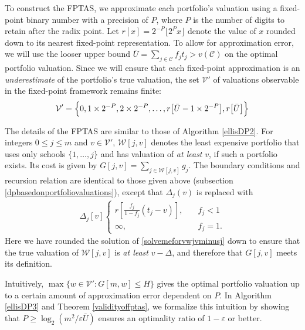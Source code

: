 \documentclass[11pt]{article} %
\theoremstyle{definition}
\begin{document}
To construct the FPTAS, we approximate each portfolio's valuation using a fixed-point binary number with a precision of $P$, where $P$ is the number of digits to retain after the radix point. Let $r[x] =  2^{-P}\lfloor 2^P x \rfloor$ denote the value of $x$ rounded down to its nearest fixed-point representation. To allow for approximation error, we will use the looser upper bound $\bar U = \sum_{j\in \mathcal{C}} f_j t_j > v(\mathcal{C})$ on the optimal portfolio valuation. Since we will ensure that each fixed-point approximation is an \emph{underestimate} of the portfolio's true valuation, the set $\mathcal{V}'$ of valuations observable in the fixed-point framework remains finite:
\begin{equation}
\mathcal{V}' = \Bigl\{0, 1\times 2^{-P}, 2\times 2^{-P}, \dots, r\bigl[\bar U- 1\times 2^{-P}\bigr], r\bigl[\bar U\bigr]\Bigr\}
\end{equation}


The details of the FPTAS are similar to those of Algorithm \ref{ellisDP2}. For integers $0 \leq j \leq m$ and $v \in \mathcal{V}'$, $\mathcal{W}[j, v]$ denotes the least expensive portfolio that uses only schools $\{ 1, \dots, j\}$ and has valuation of \emph{at least} $v$, if such a portfolio exists. Its cost is given by $G[j, v] = \sum_{j\in \mathcal{W}[j, v]} g_j$. The boundary conditions and recursion relation are identical to those given above (subsection \ref{dpbasedonportfoliovaluations}), except that $\Delta_j(v)$ is replaced with
\begin{align}
\Delta_j[v]
\begin{cases}
r\left[\frac{f_j}{1 - f_j} (t_j - v)\right], \quad & f_j < 1\\
\infty, &f_j = 1.
\end{cases} \label{clampeddeltajvdef}
\end{align}
Here we have rounded the solution of \eqref{solvemeforvwjvminusj} down to ensure that the true valuation of $\mathcal{W}[j, v]$ is \emph{at least} $v - \Delta$, and therefore that $G[j, v]$ meets its definition.

Intuitively, $\max\{ w \in \mathcal{V}': G[m, w] \leq H\}$ gives the optimal portfolio valuation up to a certain amount of approximation error dependent on $P$. In Algorithm \ref{ellisDP3} and Theorem \ref{validityoffptas}, we formalize this intuition by showing that $P \geq \log_{2}\left(m^2 / \varepsilon \bar U\right)$ ensures an optimality ratio of $1 - \varepsilon$ or better.
\end{document}
